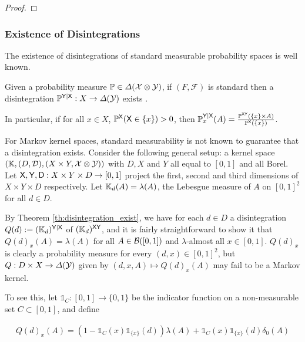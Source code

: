 \begin{proof}

\end{proof}

\subsubsection{Existence of Disintegrations}

The existence of disintegrations of standard measurable probability spaces is well known.

\begin{theorem}\label{th:disintegration_exist}
Given a probability measure $\mathbb{P}\in \Delta(\mathcal{X}\otimes \mathcal{Y})$, if $(F,\mathcal{F})$ is standard then a disintegration $\mathbb{P}^{\mathsf{Y}|\mathsf{X}}:X\to \Delta(\mathcal{Y})$ exists \citep{cinlar_probability_2011}.
\end{theorem}

In particular, if for all $x\in X$, $\mathbb{P}^{\mathsf{X}}(\mathsf{X}\in\{x\})>0$, then $\mathbb{P}^{\mathsf{Y}|\mathsf{X}}_x(A) = \frac{\mathbb{P}^{\mathsf{X}\mathsf{Y}}(\{x\}\times A)}{\mathbb{P}^{\mathsf{X}}(\{x\})}$.

For Markov kernel spaces, standard measurability is not known to guarantee that a disintegration exists. Consider the following general setup: a kernel space $(\mathbb{K},(D,\mathcal{D}),(X\times Y,\mathcal{X}\otimes\mathcal{Y}))$ with $D, X$ and $Y$ all equal to $[0,1]$ and all Borel. Let $\mathsf{X},\mathsf{Y},\mathsf{D}:X\times Y\times D\to [0,1]$ project the first, second and third dimensions of $X\times Y\times D$ respectively. Let $\mathbb{K}_d(A) = \lambda(A)$, the Lebesgue measure of $A$ on $[0,1]^2$ for all $d\in D$. 
 
By Theorem \ref{th:disintegration_exist}, we have for each $d\in D$ a disintegration $Q(d):=(\mathbb{K}_d)^{\mathsf{Y}|\mathsf{X}}$ of $(\mathbb{K}_d)^{\mathsf{X}\mathsf{Y}}$, and it is fairly straightforward to show it that $Q(d)_x(A)=\lambda(A)$ for all $A\in \mathcal{B}([0,1])$ and $\lambda$-almost all $x\in [0,1]$. $Q(d)_x$ is clearly a probability measure for every $(d,x)\in [0,1]^2$, but $Q:D\times X\to \Delta(\mathcal{Y})$ given by $(d,x,A)\mapsto Q(d)_x(A)$ may fail to be a Markov kernel. 

To see this, let $\mathds{1}_C:[0,1]\to \{0,1\}$ be the indicator function on a non-measurable set $C\subset[0,1]$, and define

\begin{align}
	Q(d)_{x}(A) = \left(1-\mathds{1}_C(x)\mathds{1}_{\{x\}}(d)\right)\lambda(A) + \mathds{1}_C(x)\mathds{1}_{\{x\}}(d)\delta_{0}(A)\label{eq:non_measurable_disint}
\end{align}


